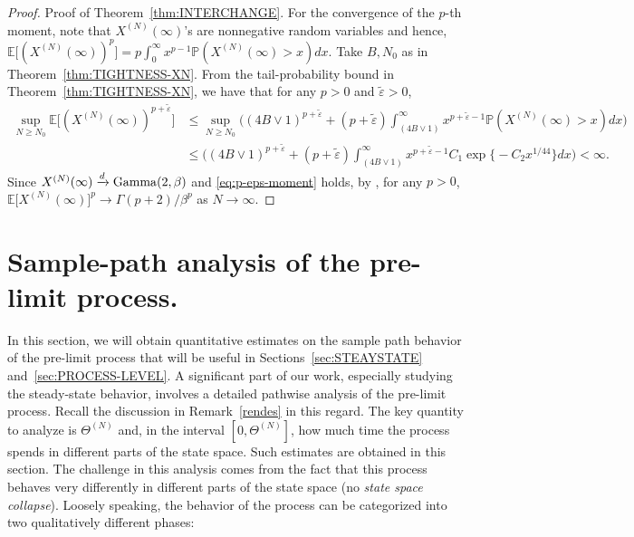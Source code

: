 \documentclass[11pt, reqno]{article}
\DeclarePairedDelimiter\autobracket{(}{)}
\newcommand{\br}[1]{\autobracket*{#1}}
\numberwithin{equation}{section}
\numberwithin{theorem}{section}
\newcommand{\newGamma}{\mathrm{Gamma}}
\newcommand{\PP}{\mathbb{P}}  				%
\newcommand{\E}{\mathbb{E}}                 %
\begin{document}
\begin{proof}{Proof of Theorem~\ref{thm:INTERCHANGE}.}
For the convergence of the $p$-th moment, note that $X^{(N)}(\infty)$'s are nonnegative random variables and hence,
$\E \Big[(X^{(N)}(\infty))^p\Big]=p\int_0^{\infty}x^{p-1}\PP (X^{(N)}(\infty)>x)dx.$
Take $B,N_0$ as in Theorem~\ref{thm:TIGHTNESS-XN}.
From the tail-probability bound in Theorem~\ref{thm:TIGHTNESS-XN}, we have that for any $p>0$ and $\tilde{\varepsilon}>0$,
\begin{equation}\label{eq:p-eps-moment}
    \begin{split}
        \sup_{N \ge N_0}\E \Big[(X^{(N)}(\infty))^{p+\tilde{\varepsilon}}\Big]&\leq\sup_{N \ge N_0} \Big((4B\vee1)^{p+\tilde{\varepsilon}}+(p+\tilde{\varepsilon})\int_{(4B\vee1)}^{\infty}x^{p+\tilde{\varepsilon}-1}\PP (X^{(N)}(\infty)>x)dx\Big)\\
        &\leq \Big((4B\vee1)^{p+\tilde{\varepsilon}}+(p+\tilde{\varepsilon})\int_{(4B\vee1)}^{\infty}x^{p+\tilde{\varepsilon}-1}C_1\exp\big\{-C_2x^{1/44}\big\}dx\Big)
        <\infty.
    \end{split}
\end{equation}
Since $X^{(N)}(\infty)\xrightarrow{d} \newGamma\br{2,\beta}$ and \eqref{eq:p-eps-moment} holds, by \cite[Corollary of Theorem 25.12]{pb12}, for any $p>0$, 
$\E \big[X^{(N)}(\infty)\big]^p\rightarrow \Gamma(p+2)/\beta^p$
as $N\to\infty$.
\end{proof}






\section{Sample-path analysis of the pre-limit process.}\label{sec:HITTIME}
In this section, we will obtain quantitative estimates on the sample path behavior of the pre-limit process that will be useful in Sections~\ref{sec:STEAYSTATE} and~\ref{sec:PROCESS-LEVEL}.
A significant part of our work, especially studying the steady-state behavior, involves a detailed pathwise analysis of the pre-limit process. 
Recall the discussion in Remark~\ref{rendes} in this regard.
The key quantity to analyze is $\Theta^{(N)}$ and, in the interval $[0, \Theta^{(N)}]$, how much time the process spends in different parts of the state space.
Such estimates are obtained in this section.
The challenge in this analysis comes from the fact that this process behaves very differently in different parts of the state space (no \emph{state space collapse}). 
Loosely speaking, the behavior of the process can be categorized into two qualitatively different phases:
\end{document}
